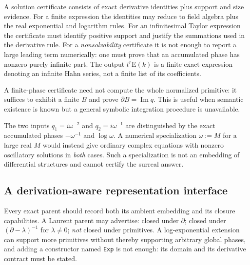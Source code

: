 \documentclass[11pt,letterpaper]{article}
\numberwithin{equation}{section}
\theoremstyle{definition}
\theoremstyle{remark}
\newcommand{\der}{\partial}
\newcommand{\Imm}{\operatorname{Im}}
\newcommand{\Emm}{\mathrm{E}}
\begin{document}
\begin{warning}
\label{diff:warn:certificatecontent}
A solution certificate consists of exact derivative identities plus support
and size evidence. For a finite expression the identities may reduce to field
algebra plus the real exponential and logarithm rules. For an infinitesimal
Taylor expression the certificate must identify positive support and justify
the summations used in the derivative rule. For a \emph{nonsolvability}
certificate it is not enough to report a large leading term numerically: one
must prove that an accumulated phase has nonzero purely infinite part. The
output $t^{r}\Emm(k)$ is a finite exact expression denoting an infinite Hahn
series, not a finite list of its coefficients.

A finite-phase certificate need not compute the whole normalized primitive: it
suffices to exhibit a finite $B$ and prove $\der B=\Imm q$. This is useful when
semantic existence is known but a general symbolic integration procedure is
unavailable.

The two inputs $q_{1}=i\omega^{-2}$ and $q_{2}=i\omega^{-1}$ are
distinguished by the exact accumulated phases $-\omega^{-1}$ and $\log\omega$.
A numerical specialization $\omega:=M$ for a large real $M$ would instead give
ordinary complex equations with nonzero oscillatory solutions in \emph{both}
cases. Such a specialization is not an embedding of differential structures and
cannot certify the surreal answer.
\end{warning}

\subsection{A derivation-aware representation interface}
\label{diff:sub:interface}

Every exact parent should record both its ambient embedding and its closure
capabilities. A Laurent parent may advertise: closed under $\der$; closed
under $(\der-\lambda)^{-1}$ for $\lambda\neq0$; \emph{not} closed under
primitives. A log-exponential extension can support more primitives without
thereby supporting arbitrary global phases, and adding a constructor named
\texttt{Exp} is not enough: its domain and its derivative contract must be
stated.
\end{document}
